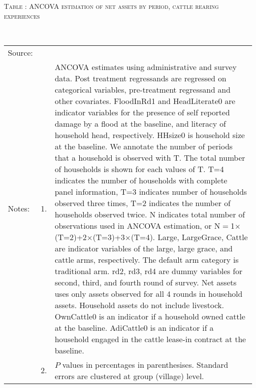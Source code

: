 \vspace{-1cm}\hspace{-1cm}\begin{minipage}[t]{14cm}
\hfil\textsc{\normalsize Table \thetable: ANCOVA estimation of net assets by period, cattle rearing experiences\label{tab ANCOVA narrow net assets Experience timevarying}}\\
\setlength{\tabcolsep}{1pt}
\setlength{\baselineskip}{8pt}
\renewcommand{\arraystretch}{.52}
\hfil{}\\
\renewcommand{\arraystretch}{.8}
\setlength{\tabcolsep}{1pt}
\begin{tabular}{>{\hfill\scriptsize}p{1cm}<{}>{\hfill\scriptsize}p{.25cm}<{}>{\scriptsize}p{12cm}<{\hfill}}
Source:& \multicolumn{2}{l}{\scriptsize Estimated with GUK administrative and survey data.}\\
Notes: & 1. & ANCOVA estimates using administrative and survey data. Post treatment regressands are regressed on categorical variables, pre-treatment regressand and other covariates. \textsf{FloodInRd1} and \textsf{HeadLiterate0} are indicator variables for the presence of self reported damage by a flood at the baseline, and literacy of household head, respectively. \textsf{HHsize0} is household size at the baseline. We annotate the number of periods that a household is observed with \textsf{T}. The total number of households is shown for each values of \textsf{T}. \textsf{T=4} indicates the number of households with complete panel information, \textsf{T=3} indicates number of households observed three times, \textsf{T=2} indicates the number of households observed twice. \textsf{N} indicates total number of observations used in ANCOVA estimation, or \textsf{N$=$1$\times$(T=2)+2$\times$(T=3)+3$\times$(T=4)}.  \textsf{Large}, \textsf{LargeGrace}, \textsf{Cattle} are indicator variables of the \textsf{large}, \textsf{large grace}, and \textsf{cattle} arms, respectively. The default arm category is \textsf{traditional} arm. \textsf{rd2, rd3, rd4} are dummy variables for second, third, and fourth round of survey. Net assets uses only assets observed for all 4 rounds in household assets. Household assets do not include livestock. \textsf{OwnCattle0} is an indicator if a household owned cattle at the baseline. \textsf{AdiCattle0} is an indicator if a household engaged in the cattle lease-in contract at the baseline.  \\
& 2. & $P$ values in percentages in parenthesises. Standard errors are clustered at group (village) level.
\end{tabular}
\end{minipage}

